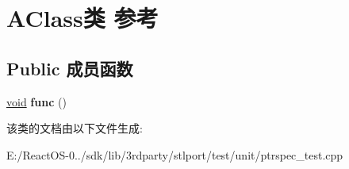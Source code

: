 \hypertarget{class_a_class}{}\section{A\+Class类 参考}
\label{class_a_class}
\subsection*{Public 成员函数}
\begin{DoxyCompactItemize}
\item 
\mbox{\label{class_a_class_a6e9a26baabf884fe0fb35e0278fd6945}} 
\hyperlink{interfacevoid}{void} {\bfseries func} ()
\end{DoxyCompactItemize}


该类的文档由以下文件生成\+:\begin{DoxyCompactItemize}
\item 
E\+:/\+React\+O\+S-\/0../sdk/lib/3rdparty/stlport/test/unit/ptrspec\+\_\+test.\+cpp\end{DoxyCompactItemize}
